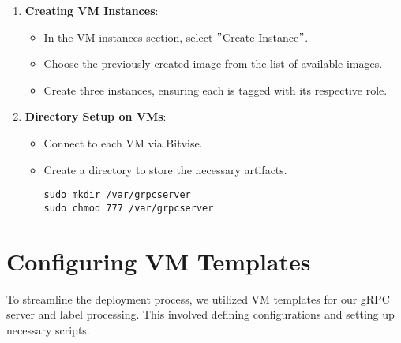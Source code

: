 \begin{enumerate}
    \item \textbf{Creating VM Instances}:
    \begin{itemize}
        \item In the VM instances section, select \("\)Create Instance\("\).
        \item Choose the previously created image from the list of available images.
        \item Create three instances, ensuring each is tagged with its respective role.
    \end{itemize}

    \item \textbf{Directory Setup on VMs}:
    \begin{itemize}
        \item Connect to each VM via Bitvise.
        \item Create a directory to store the necessary artifacts.
        \begin{verbatim}
sudo mkdir /var/grpcserver
sudo chmod 777 /var/grpcserver
        \end{verbatim}
    \end{itemize}
\end{enumerate}


\section{Configuring VM Templates}\label{sec:configuring-vm-templates}

To streamline the deployment process, we utilized VM templates for our gRPC server and label processing. This involved defining configurations and setting up necessary scripts.


